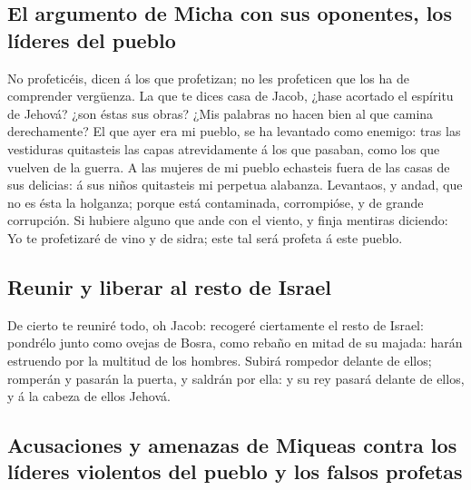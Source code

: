 \hypertarget{el-argumento-de-micha-con-sus-oponentes-los-luxedderes-del-pueblo}{%
\subsection{El argumento de Micha con sus oponentes, los líderes del
pueblo}\label{el-argumento-de-micha-con-sus-oponentes-los-luxedderes-del-pueblo}}

 No profeticéis, dicen á los que profetizan; no les
profeticen que los ha de comprender vergüenza.  La que te
dices casa de Jacob, ¿hase acortado el espíritu de Jehová? ¿son éstas
sus obras? ¿Mis palabras no hacen bien al que camina derechamente?
 El que ayer era mi pueblo, se ha levantado como enemigo:
tras las vestiduras quitasteis las capas atrevidamente á los que
pasaban, como los que vuelven de la guerra.  A las mujeres
de mi pueblo echasteis fuera de las casas de sus delicias: á sus niños
quitasteis mi perpetua alabanza.  Levantaos, y andad, que
no es ésta la holganza; porque está contaminada, corrompióse, y de
grande corrupción.  Si hubiere alguno que ande con el
viento, y finja mentiras diciendo: Yo te profetizaré de vino y de sidra;
este tal será profeta á este pueblo.

\hypertarget{reunir-y-liberar-al-resto-de-israel}{%
\subsection{Reunir y liberar al resto de
Israel}\label{reunir-y-liberar-al-resto-de-israel}}

 De cierto te reuniré todo, oh Jacob: recogeré ciertamente
el resto de Israel: pondrélo junto como ovejas de Bosra, como rebaño en
mitad de su majada: harán estruendo por la multitud de los hombres.
 Subirá rompedor delante de ellos; romperán y pasarán la
puerta, y saldrán por ella: y su rey pasará delante de ellos, y á la
cabeza de ellos Jehová.

\hypertarget{acusaciones-y-amenazas-de-miqueas-contra-los-luxedderes-violentos-del-pueblo-y-los-falsos-profetas}{%
\subsection{Acusaciones y amenazas de Miqueas contra los líderes
violentos del pueblo y los falsos
profetas}\label{acusaciones-y-amenazas-de-miqueas-contra-los-luxedderes-violentos-del-pueblo-y-los-falsos-profetas}}

